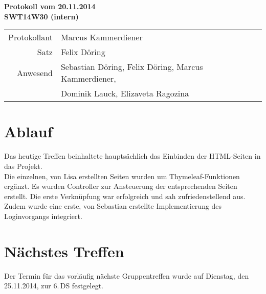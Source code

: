 \documentclass{scrartcl}
\begin{document}
\begin{center}
\LARGE \bf{Protokoll vom 20.11.2014 \\
SWT14W30 (intern)}
\end{center}

\begin{tabular}{rp{10cm}}
Protokollant & Marcus Kammerdiener \\
Satz & Felix Döring \\
Anwesend & Sebastian Döring, Felix Döring, Marcus Kammerdiener,\\
& Dominik Lauck, Elizaveta Ragozina \\
\end{tabular}

\vspace*{3em}

\section{Ablauf}
Das heutige Treffen beinhaltete hauptsächlich das Einbinden der HTML-Seiten in das Projekt. \\
Die einzelnen, von Lisa erstellten Seiten wurden um Thymeleaf-Funktionen ergänzt. Es wurden Controller zur Ansteuerung der entsprechenden Seiten erstellt.
Die erste Verknüpfung war erfolgreich und sah zufriedenstellend aus. Zudem wurde eine erste, von Sebastian erstellte Implementierung des Loginvorgangs integriert.

\vspace*{1em}

\section{N\"achstes Treffen}
Der Termin für das vorläufig nächste Gruppentreffen wurde auf Dienstag, den 25.11.2014, zur 6.\,DS festgelegt.
\end{document}
